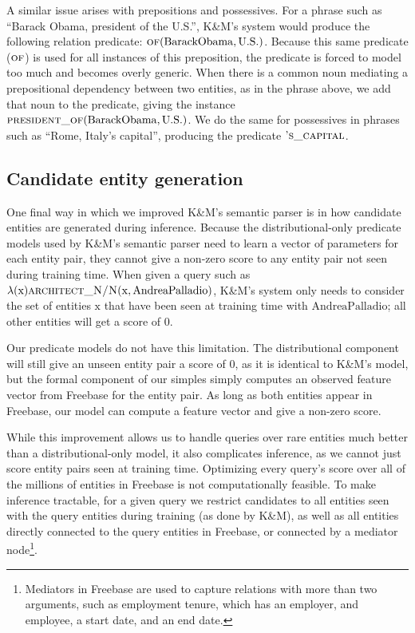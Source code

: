\documentclass[11pt]{article}
\newcommand{\predicate}[1]{\ensuremath{\textsc{#1}}}
\newcommand{\entity}[1]{\ensuremath{\mathrm{#1}}}
\begin{document}
A similar issue arises with prepositions and possessives.  For a phrase such as
``Barack Obama, president of the U.S.'', K\&M's system would produce the
following relation predicate: $\predicate{of}(\entity{Barack Obama},
\entity{U.S.})$.  Because this same predicate (\predicate{of}) is used for all
instances of this preposition, the predicate is forced to model too much and
becomes overly generic.  When there is a common noun mediating a prepositional
dependency between two entities, as in the phrase above, we add that noun to
the predicate, giving the instance $\predicate{president\_of}(\entity{Barack
Obama}, \entity{U.S.})$.  We do the same for possessives in phrases such as
``Rome, Italy's capital'', producing the predicate \predicate{'s\_capital}.

\subsection{Candidate entity generation}
\label{sec:better-candidates}

One final way in which we improved K\&M's semantic parser is in how candidate
entities are generated during inference.  Because the distributional-only
predicate models used by K\&M's semantic parser need to learn a vector of
parameters for each entity pair, they cannot give a non-zero score to any
entity pair not seen during training time.  When given a query such as
$\lambda(\entity{x}) \predicate{architect\_N/N}(\entity{x}, \entity{Andrea
Palladio})$, K\&M's system only needs to consider the set of entities
$\entity{x}$ that have been seen at training time with \entity{Andrea
Palladio}; all other entities will get a score of 0.

Our predicate models do not have this limitation.  The distributional component
will still give an unseen entity pair a score of 0, as it is identical to K\&M's
model, but the formal component of our simples simply computes an observed
feature vector from Freebase for the entity pair.  As long as both entities
appear in Freebase, our model can compute a feature vector and give a non-zero
score.

While this improvement allows us to handle queries over rare entities much
better than a distributional-only model, it also complicates inference, as we
cannot just score entity pairs seen at training time.  Optimizing every query's
score over all of the millions of entities in Freebase is not computationally
feasible.  To make inference tractable, for a given query we restrict
candidates to all entities seen with the query entities during training (as
done by K\&M), as well as all entities directly connected to the query entities
in Freebase, or connected by a mediator node\footnote{Mediators in Freebase are
used to capture relations with more than two arguments, such as employment
tenure, which has an employer, and employee, a start date, and an end date.}.
\end{document}
